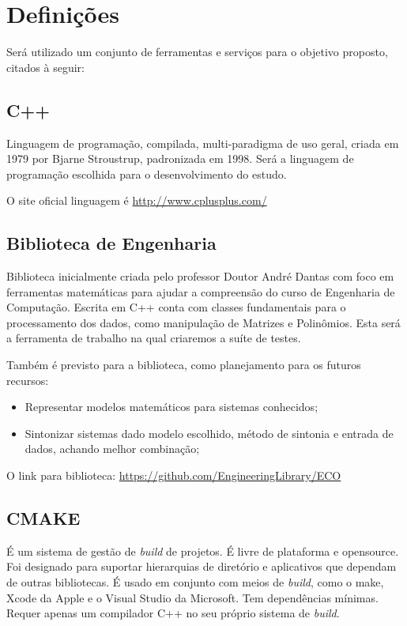 \documentclass[
	article,			%
	12pt,				%
	oneside,			%
	a4paper,			%
	english,			
	brazil,
	sumario=tradicional
	]{abntex2}
\begin{document}
\pagebreak
\section{Definições}

Será utilizado um conjunto de ferramentas e serviços para o objetivo proposto, citados à seguir:

\subsection{C++}

Linguagem de programação, compilada, multi-paradigma de uso geral, criada em 1979 por Bjarne Stroustrup, padronizada em 1998. Será a linguagem de programação escolhida para o desenvolvimento do estudo.

O site oficial linguagem é \href{http://www.cplusplus.com/}{http://www.cplusplus.com/}

\pagebreak
\subsection{Biblioteca de Engenharia}

Biblioteca inicialmente criada pelo professor Doutor André Dantas com foco em ferramentas matemáticas para ajudar a compreensão do curso de Engenharia de Computação. Escrita em C++ conta com classes fundamentais para o processamento dos dados, como manipulação de Matrizes e Polinômios. Esta será a ferramenta de trabalho na qual criaremos a suíte de testes.

Também é previsto para a biblioteca, como planejamento para os futuros recursos:

\begin{itemize}
	\item Representar modelos matemáticos para sistemas conhecidos;
	\item Sintonizar sistemas dado modelo escolhido, método de sintonia e entrada de dados, achando melhor combinação;
\end{itemize}

O link para biblioteca: \href{https://github.com/EngineeringLibrary/ECO}{https://github.com/EngineeringLibrary/ECO}

\pagebreak
\subsection{CMAKE}
É um sistema de gestão de \textit{build} de projetos. É livre de plataforma e opensource. Foi designado para suportar hierarquias de diretório e aplicativos que dependam de outras bibliotecas. É usado em conjunto com meios de \textit{build}, como o make, Xcode da Apple e o Visual Studio da Microsoft. Tem dependências mínimas. Requer apenas um compilador C++ no seu próprio sistema de \textit{build}.
\end{document}

